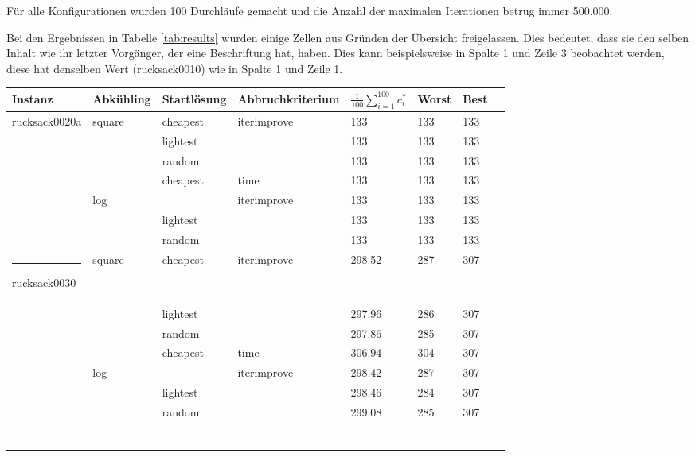 \documentclass[11pt,a4paper]{article}
\makeatletter
\def\hlinewd#1{
  \noalign{\ifnum0=`}\fi\hrule \@height #1 \futurelet
  \reserved@a\@xhline
}
\makeatother
\begin{document}
Für alle Konfigurationen wurden 100 Durchläufe gemacht und die Anzahl der maximalen Iterationen betrug immer 500.000.

Bei den Ergebnissen in Tabelle \ref{tab:results} wurden einige Zellen aus Gründen der Übersicht freigelassen. Dies bedeutet, dass sie den selben Inhalt wie ihr letzter Vorgänger, der eine Beschriftung hat, haben. Dies kann beispielsweise in Spalte 1 und Zeile 3 beobachtet werden, diese hat denselben Wert (rucksack0010) wie in Spalte 1 und Zeile 1.

\clearpage

\begin{table}[!t]
  \centering
  \begin{tabular}{ | l | l | l | l | l | l | l | l | }
    \hline
        \textbf{Instanz} & \textbf{Abkühling} & \textbf{Startlösung} & \textbf{Abbruchkriterium} & \textbf{\(\frac{1}{100}\displaystyle\sum_{i=1}^{100} c_i^*\)} & \textbf{Worst} & \textbf{Best} \\ \hline
        rucksack0020a & square & cheapest & iterimprove & 133 & 133 & 133 \\ \hline
        &             & lightest & & 133 & 133 & 133 \\ \hline
        &             & random & & 133 & 133 & 133 \\ \hline
        &             & cheapest & time & 133 & 133 & 133 \\ \hline
        & log         & & iterimprove & 133 & 133 & 133 \\ \hline
        &             & lightest & & 133 & 133 & 133 \\ \hline
        &             & random & & 133 & 133 & 133 \\ \hlinewd{3pt}
        rucksack0030 & square & cheapest & iterimprove & 298.52 & 287 & 307 \\ \hline
        &            & lightest & & 297.96 & 286 & 307 \\ \hline
        &            & random & & \textcolor{BrickRed}{297.86} & 285 & 307 \\ \hline
        &            & cheapest & time & \textcolor{OliveGreen}{306.94} & 304 & 307 \\ \hline
        & log        & & iterimprove & 298.42 & 287 & 307 \\ \hline
        &            & lightest & & 298.46 & 284 & 307 \\ \hline
        &            & random & & 299.08 & 285 & 307 \\ \hlinewd{3pt}

\end{tabular}
\end{table}
\end{document}
